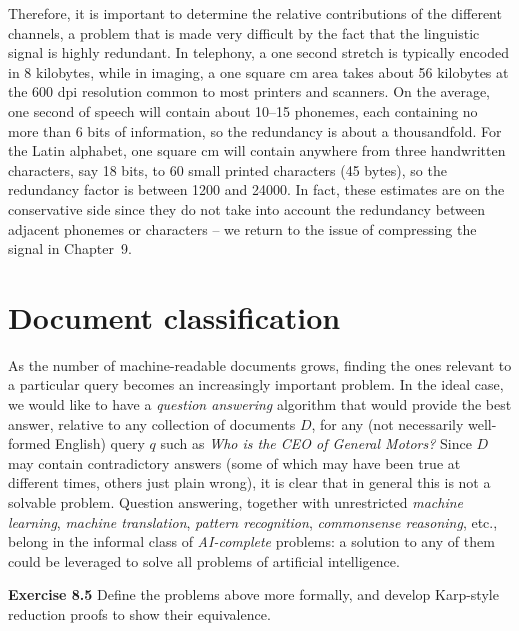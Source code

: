 Therefore, it is important to determine the relative contributions of the
different channels, a problem that is made very difficult by the fact that the
linguistic signal is highly redundant. In telephony, a one second stretch is
typically encoded in 8 kilobytes, while in imaging, a one square cm area takes
about 56 kilobytes at the 600 dpi resolution common to most printers and
scanners. On the average, one second of speech will contain about 10--15
phonemes, each containing no more than 6 bits of information, so the
redundancy is about a thousandfold. For the Latin alphabet, one square cm will
contain anywhere from three handwritten characters, say 18 bits, to 60 small
printed characters (45 bytes), so the redundancy factor is between 1200 and
24000. In fact, these estimates are on the conservative side since they do not
take into account the redundancy between adjacent phonemes or characters -- we
return to the issue of compressing the signal in Chapter~9.

\section{Document classification}

As the number of machine-readable documents grows, finding the ones relevant
to a particular query becomes an increasingly important problem. In the ideal
case, we would like to have a {\sl question answering} algorithm that would
provide the best answer, relative to any collection of documents $D$, for any
(not necessarily well-formed English) query $q$ such as {\it Who is the CEO of
  General Motors?} Since $D$ may contain contradictory answers (some of which
may have been true at different times, others just plain wrong), it is clear
that in general this is not a solvable problem. Question answering, together
with unrestricted {\sl machine learning}, {\sl machine translation}, {\sl
  pattern recognition}, {\sl commonsense reasoning}, etc., belong in the
informal class of {\sl AI-complete} problems: a solution to any of them could
be leveraged to solve all problems of artificial
intelligence. 
 

\smallskip\noindent
{\bf Exercise 8.5} Define the problems above more formally, and develop
Karp-style reduction proofs to show their equivalence. 

